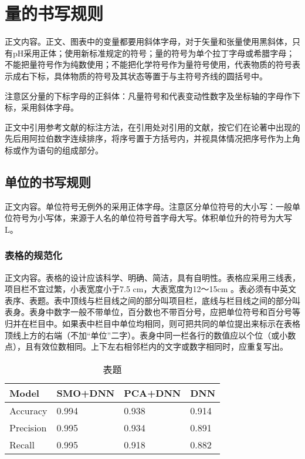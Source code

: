 \section{量的书写规则}
正文内容。正文、图表中的变量都要用斜体字母，对于矢量和张量使用黑斜体，只有pH采用正体；使用新标准规定的符号\cite{simonyan2014very}；量的符号为单个拉丁字母或希腊字母；不能把量符号作为纯数使用；不能把化学符号作为量符号使用，代表物质的符号表示成右下标，具体物质的符号及其状态等置于与主符号齐线的圆括号中。

注意区分量的下标字母的正斜体：凡量符号和代表变动性数字及坐标轴的字母作下标，采用斜体字母。

正文中引用参考文献的标注方法，在引用处对引用的文献，按它们在论著中出现的先后用阿拉伯数字连续排序，将序号置于方括号内，并视具体情况把序号作为上角标或作为语句的组成部分。
\subsection{单位的书写规则}
正文内容。单位符号无例外的采用正体字母。注意区分单位符号的大小写：一般单位符号为小写体，来源于人名的单位符号首字母大写。体积单位升的符号为大写L。
\subsubsection{表格的规范化}
正文内容。表格的设计应该科学、明确、简洁，具有自明性。表格应采用三线表，项目栏不宜过繁，小表宽度小于7.5 cm，大表宽度为12～15cm 。表必须有中英文表序、表题。表中顶线与栏目线之间的部分叫项目栏，底线与栏目线之间的部分叫表身。表身中数字一般不带单位，百分数也不带百分号，应把单位符号和百分号等归并在栏目中。如果表中栏目中单位均相同，则可把共同的单位提出来标示在表格顶线上方的右端（不加“单位”二字）。表身中同一栏各行的数值应以个位（或小数点），且有效位数相同。上下左右相邻栏内的文字或数字相同时，应重复写出。

\begin{table}[H]
	\xiaowuhao
	\centering
	\caption{\label{tab11} \xiaowuhao \hei 表题}
	\begin{tabular}{llll}
		\toprule
		Model                 & SMO+DNN & PCA+DNN & DNN   \\
		\midrule
		Accuracy              & 0.994   & 0.938   & 0.914 \\
		Precision             & 0.995   & 0.934   & 0.891 \\
		Recall                & 0.995   & 0.918   & 0.882 \\
		\bottomrule
	\end{tabular}
\end{table}